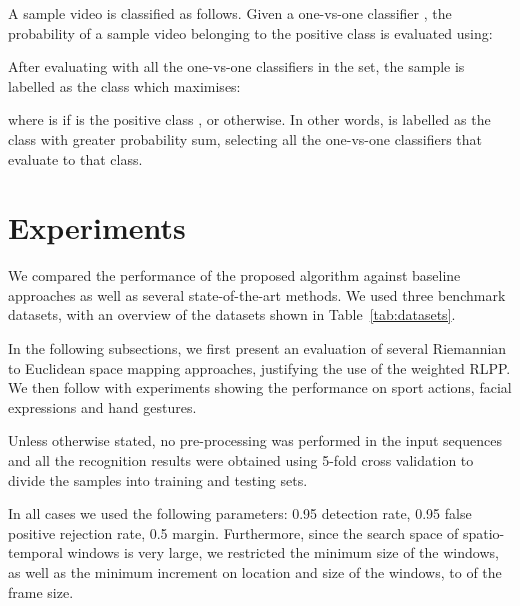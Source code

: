 \documentclass[10pt,twocolumn,letterpaper]{article}
\newcommand{\tab}[1]{\mbox{Table~\ref{#1}}}
\newcommand{\eqsize}{\footnotesize}
\begin{document}
A sample video {\eqsize } is classified as follows.
Given a one-vs-one classifier {\eqsize },
the probability of a sample video {\eqsize } belonging to the positive class {\eqsize } is evaluated using:

\vspace{-2ex}
\eqsize

\normalsize

After evaluating {\eqsize } with all the one-vs-one classifiers in the set,
the sample is labelled as the class {\small } which maximises:

\vspace{-2ex}
\eqsize

\normalsize

\noindent
where {\eqsize } is {\eqsize }
if {\small } is the positive class {\small },
or {\small } otherwise.
In other words, {\eqsize } is labelled as the class with greater probability sum,
selecting all the one-vs-one classifiers that evaluate to that class.
\section{Experiments}
\label{sec:experiments}


We compared the performance of the proposed algorithm against 
baseline approaches as well as several state-of-the-art methods.
We used three benchmark datasets, with an overview of the datasets shown in \tab{tab:datasets}.

In the following subsections,
we first present an evaluation of several Riemannian to Euclidean space mapping approaches,
justifying the use of the weighted RLPP.
We then follow with experiments showing the performance on sport actions,
facial expressions and hand gestures.

Unless otherwise stated, no pre-processing was performed in the input sequences
and all the recognition results were obtained using 5-fold cross validation to divide the samples into training and testing sets.


In all cases we used the following parameters:
0.95 detection rate, 0.95 false positive rejection rate, 0.5 margin.
Furthermore, since the search space of spatio-temporal windows is very large,
we restricted the minimum size of the windows,
as well as the minimum increment on location and size of the windows, to {\small } of the frame size.
\end{document}
